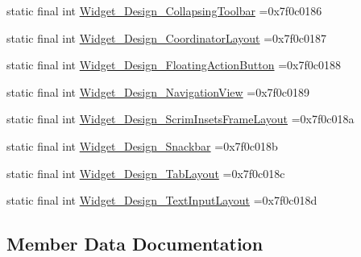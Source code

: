 \begin{DoxyCompactItemize}
\item 
static final int \mbox{\hyperlink{classbr_1_1unb_1_1cic_1_1mp_1_1marketmaster_1_1test_1_1R_1_1style_ac6f71bc5bf547db43e1698b835626471}{Widget\+\_\+\+Design\+\_\+\+Collapsing\+Toolbar}} =0x7f0c0186
\item 
static final int \mbox{\hyperlink{classbr_1_1unb_1_1cic_1_1mp_1_1marketmaster_1_1test_1_1R_1_1style_ab9fe97ac9594c7547f4a61cedcdf5e7f}{Widget\+\_\+\+Design\+\_\+\+Coordinator\+Layout}} =0x7f0c0187
\item 
static final int \mbox{\hyperlink{classbr_1_1unb_1_1cic_1_1mp_1_1marketmaster_1_1test_1_1R_1_1style_a3748c948da8762d71267f522b6030ce1}{Widget\+\_\+\+Design\+\_\+\+Floating\+Action\+Button}} =0x7f0c0188
\item 
static final int \mbox{\hyperlink{classbr_1_1unb_1_1cic_1_1mp_1_1marketmaster_1_1test_1_1R_1_1style_aa116a676dd3941e4933dad1d98242739}{Widget\+\_\+\+Design\+\_\+\+Navigation\+View}} =0x7f0c0189
\item 
static final int \mbox{\hyperlink{classbr_1_1unb_1_1cic_1_1mp_1_1marketmaster_1_1test_1_1R_1_1style_a5694de3f61d9f6a4407e47411603f61c}{Widget\+\_\+\+Design\+\_\+\+Scrim\+Insets\+Frame\+Layout}} =0x7f0c018a
\item 
static final int \mbox{\hyperlink{classbr_1_1unb_1_1cic_1_1mp_1_1marketmaster_1_1test_1_1R_1_1style_a7bbfb00045910e65f9ab30d0ee505503}{Widget\+\_\+\+Design\+\_\+\+Snackbar}} =0x7f0c018b
\item 
static final int \mbox{\hyperlink{classbr_1_1unb_1_1cic_1_1mp_1_1marketmaster_1_1test_1_1R_1_1style_aa0c080ae1a9dd8fd0f81f132873b0dc7}{Widget\+\_\+\+Design\+\_\+\+Tab\+Layout}} =0x7f0c018c
\item 
static final int \mbox{\hyperlink{classbr_1_1unb_1_1cic_1_1mp_1_1marketmaster_1_1test_1_1R_1_1style_aa63cfc420aae383606adb3f5f78dca69}{Widget\+\_\+\+Design\+\_\+\+Text\+Input\+Layout}} =0x7f0c018d
\end{DoxyCompactItemize}


\subsection{Member Data Documentation}
\mbox{\label{classbr_1_1unb_1_1cic_1_1mp_1_1marketmaster_1_1test_1_1R_1_1style_a02ce69772a8a323a610f7f85800d042f}} 
